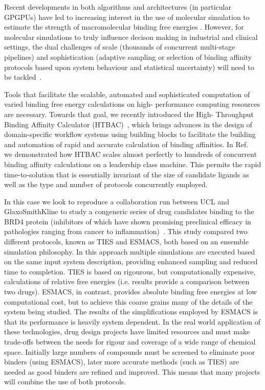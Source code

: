 Recent developments in both algorithms and architectures (in particular
GPGPUs) have led to increasing interest in the use of molecular simulation to
estimate the strength of macromolecular binding free energies
\cite{DeVivo2016}. However, for molecular simulations to truly influence
decison making in industrial and clinical settings, the dual challenges of
scale (thousands of concurrent multi-stage pipelines) and sophistication
(adaptive sampling or selection of binding affinity protocols based upon
system behaviour and statistical uncertainty) will need to be
tackled~\cite{XX}.


Tools that facilitate the scalable, automated and sophisticated computation of
varied binding free energy calculations on high- performance computing
resources are necessary. Towards that goal, we recently introduced the High-
Throughput Binding Affinity Calculator (HTBAC)~\cite{dakka2017}, which brings
advances in the design of domain-specific workflow systems using building
blocks to facilitate the building and automation of rapid and accurate
calculation of binding affinities. In Ref.~\cite{dakka2017} we demonstrated
how HTBAC scales almost perfectly to hundreds of concurrent binding affinity
calculations on a leadership class machine. This permits the rapid 
time-to-solution that is essentially invariant of the size of candidate ligands as
well as the type and number of protocols concurrently employed.

In this case we look to reproduce a collaboration run between UCL and
GlaxoSmithKline to study a congeneric series of drug candidates binding to the
BRD4 protein (inhibitors of which have shown promising preclinical efficacy in
pathologies ranging from cancer to inflammation)~\cite{Wan2017brd4}. This
study compared two different protocols, known as TIES and ESMACS, both based
on an ensemble simulation philosophy. In this approach multiple simulations
are executed based on the same input system description, providing enhanced
sampling and reduced time to completion. TIES is based on rigourous, but
computationally expensive, calculations of relative free energies (i.e.
results provide a comparison between two drugs). ESMACS, in contrast, provides
absolute binding free energies at low computational cost, but to achieve this
coarse grains many of the details of the system being studied. The results of
the simplifications employed by ESMACS is that its performance is heavily
system dependent. In the real world application of these technologies, drug
design projects have limited resources and must make trade-offs between the
needs for rigour and coverage of a wide range of chemical space. Initially
large numbers of compounds must be screened to eliminate poor binders (using
ESMACS), later more accurate methods (such as TIES) are needed as good binders
are refined and improved. This means that many projects will combine the use
of both protocols.

